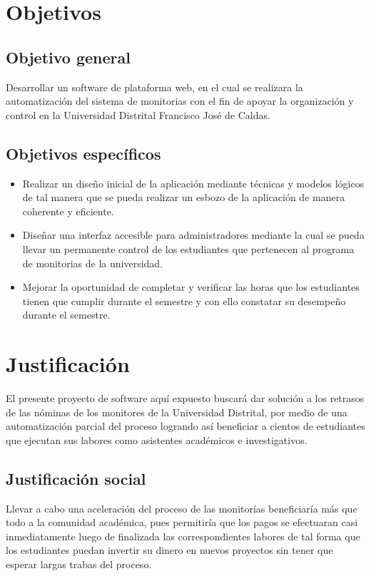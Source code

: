 \section{Objetivos}
\subsection{Objetivo general}
Desarrollar un software de plataforma web, en el cual se realizara la automatización del sistema de monitorias con el fin de apoyar la organización y control en la Universidad Distrital Francisco José de Caldas.
\subsection{Objetivos específicos}
\begin{itemize}
\item Realizar un diseño inicial de la aplicación mediante técnicas y modelos lógicos de tal manera que se pueda realizar un esbozo de la aplicación de manera coherente y eficiente.
\end{itemize}
\begin{itemize}
\item Diseñar una interfaz accesible para administradores mediante la cual se pueda llevar un permanente control de los estudiantes que pertenecen al programa de monitorias de la universidad.
\end{itemize}
\begin{itemize}
\item Mejorar la oportunidad de completar y verificar las horas que los estudiantes tienen que cumplir  durante el semestre y con ello constatar su desempeño durante el semestre.
\end{itemize}

\newpage
\section{Justificación}
El presente proyecto de software aquí expuesto buscará dar solución a los retrasos de las nóminas de los monitores de la Universidad Distrital, por medio de una automatización parcial del proceso logrando así beneficiar a cientos de estudiantes que ejecutan sus labores como asistentes académicos e investigativos.
\subsection{Justificación social}
Llevar a cabo una aceleración del proceso de las monitorías beneficiaría más que todo a la comunidad académica, pues permitiría que los pagos se efectuaran casi inmediatamente luego de finalizada las correspondientes labores de tal forma que los estudiantes puedan invertir su dinero en nuevos proyectos sin tener que esperar largas trabas del proceso.
